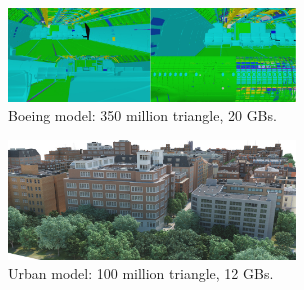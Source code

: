 \documentclass[conference]{acmsiggraph}
\begin{document}
\begin{figure}[ht]
  \centering
  \includegraphics[width=3.0in]{boeing.jpg}
  \caption{Boeing model: 350 million triangle, 20 GBs. }
  \label{fig:model2}
\end{figure}

\begin{figure}[ht]
  \centering
  \includegraphics[width=3.0in]{densecity.jpg}
  \caption{Urban model: 100 million triangle, 12 GBs. }
  \label{fig:model3}
\end{figure}
\end{document}
